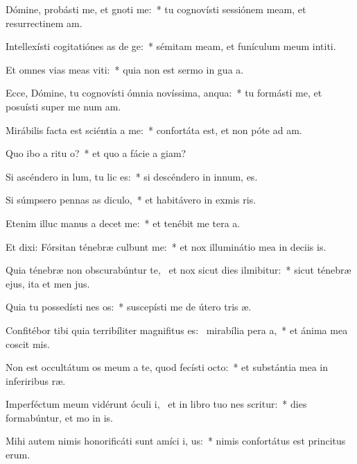 \item Dómine, probásti me, et gnoti me:~* tu cognovísti sessiónem meam, et resurrectinem am.
\item Intellexísti cogitatiónes as de ge:~* sémitam meam, et funículum meum intiti.
\item Et omnes vias meas viti:~* quia non est sermo in gua a.
\item Ecce, Dómine, tu cognovísti ómnia novíssima,  anqua:~* tu formásti me, et posuísti super me num am.
\item Mirábilis facta est sciéntia a  me:~* confortáta est, et non póte ad am.
\item Quo ibo a ritu o?~* et quo a fácie a giam?
\item Si ascéndero in lum, tu lic es:~* si descéndero in innum, es.
\item Si súmpsero pennas as diculo,~* et habitávero in exmis ris.
\item Etenim illuc manus a decet me:~* et tenébit me tera a.
\item Et dixi: Fórsitan ténebræ culbunt me:~* et nox illuminátio mea in deciis is.
\item Quia ténebræ non obscurabúntur  te,~\pscross{} et nox sicut dies ilmibitur:~* sicut ténebræ ejus, ita et men jus.
\item Quia tu possedísti nes os:~* suscepísti me de útero tris æ.
\item Confitébor tibi quia terribíliter magnifitus es:~\pscross{} mirabília pera a,~* et ánima mea coscit mis.
\item Non est occultátum os meum a te, quod fecísti  octo:~* et substántia mea in inferiribus ræ.
\item Imperféctum meum vidérunt óculi i,~\pscross{} et in libro tuo nes scritur:~* dies formabúntur, et mo in is.
\item Mihi autem nimis honorificáti sunt amíci i, us:~* nimis confortátus est princitus erum.
